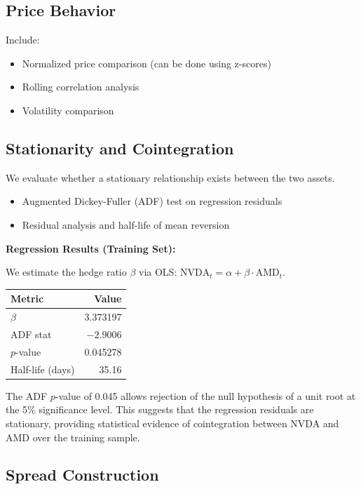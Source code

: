 \documentclass[11pt]{article}
\begin{document}
\subsection{Price Behavior}

Include:

\begin{itemize}
\item Normalized price comparison (can be done using z-scores)
\item Rolling correlation analysis
\item Volatility comparison
\end{itemize}

\subsection{Stationarity and Cointegration}

We evaluate whether a stationary relationship exists between the two assets.

\begin{itemize}
\item Augmented Dickey-Fuller (ADF) test on regression residuals
\item Residual analysis and half-life of mean reversion
\end{itemize}

\textbf{Regression Results (Training Set):}

We estimate the hedge ratio $\beta$ via OLS: $\text{NVDA}_t = \alpha + \beta \cdot \text{AMD}_t$.

\begin{center}
\begin{tabular}{lr}
\toprule
\textbf{Metric} & \textbf{Value} \\
\midrule
$\beta$ & 3.373197 \\
ADF stat & $-2.9006$ \\
$p$-value & 0.045278 \\
Half-life (days) & 35.16 \\
\bottomrule
\end{tabular}
\end{center}

The ADF $p$-value of 0.045 allows rejection of the null hypothesis of a unit root at the 5\% significance level. This suggests that the regression residuals are stationary, providing statistical evidence of cointegration between NVDA and AMD over the training sample.


\subsection{Spread Construction}
\end{document}
